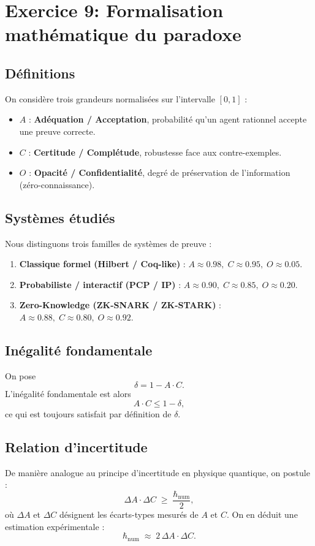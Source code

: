 \documentclass[12pt,a4paper]{report}
\begin{document}
\section*{Exercice 9: Formalisation mathématique du paradoxe}

\subsection*{Définitions}
On considère trois grandeurs normalisées sur l'intervalle $[0,1]$ :
\begin{itemize}
	\item $A$ : \textbf{Adéquation / Acceptation}, probabilité qu'un agent rationnel accepte une preuve correcte.
	\item $C$ : \textbf{Certitude / Complétude}, robustesse face aux contre-exemples.
	\item $O$ : \textbf{Opacité / Confidentialité}, degré de préservation de l'information (zéro-connaissance).
\end{itemize}

\subsection*{Systèmes étudiés}
Nous distinguons trois familles de systèmes de preuve :
\begin{enumerate}
	\item \textbf{Classique formel (Hilbert / Coq-like)} : $A \approx 0.98,\; C \approx 0.95,\; O \approx 0.05$.
	\item \textbf{Probabiliste / interactif (PCP / IP)} : $A \approx 0.90,\; C \approx 0.85,\; O \approx 0.20$.
	\item \textbf{Zero-Knowledge (ZK-SNARK / ZK-STARK)} : $A \approx 0.88,\; C \approx 0.80,\; O \approx 0.92$.
\end{enumerate}

\subsection*{Inégalité fondamentale}
On pose
\[
\delta = 1 - A \cdot C.
\]
L'inégalité fondamentale est alors
\[
A \cdot C \leq 1 - \delta,
\]
ce qui est toujours satisfait par définition de $\delta$.

\subsection*{Relation d'incertitude}
De manière analogue au principe d'incertitude en physique quantique, on postule :
\[
\Delta A \cdot \Delta C \;\geq\; \frac{\hbar_{\text{num}}}{2},
\]
où $\Delta A$ et $\Delta C$ désignent les écarts-types mesurés de $A$ et $C$.  
On en déduit une estimation expérimentale :
\[
\hbar_{\text{num}} \;\approx\; 2 \,\Delta A \cdot \Delta C.
\]
\end{document}
